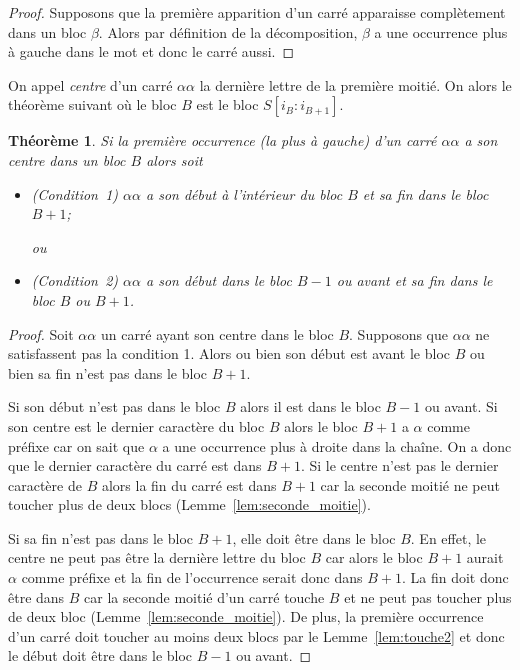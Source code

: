 \documentclass[10pt,letterpaper,oneside]{article}
\newtheorem{theorem}{Théorème}
\begin{document}
\begin{proof}
    Supposons que la première apparition d'un carré apparaisse complètement dans un bloc $\beta$. Alors par définition de la décomposition, $\beta$ a une occurrence plus à gauche dans le mot et donc le carré aussi.
\end{proof}

On appel \emph{centre} d'un carré $\alpha\alpha$ la dernière lettre de la première moitié. On alors le théorème suivant où le bloc $B$ est le bloc $S[i_B:i_{B+1}]$.

\begin{theorem} \label{thm:conditioncarre}
    Si la première occurrence (la plus à gauche) d'un carré $\alpha\alpha$ a son centre dans un bloc $B$ alors soit
    \begin{itemize}
        \item (Condition~1) $\alpha\alpha$ a son début  à l'intérieur du bloc $B$ et sa fin dans le bloc $B+1$;
        
        ou
        \item (Condition~2) $\alpha\alpha$ a son début dans le bloc $B-1$ ou avant et sa fin dans le bloc $B$ ou $B+1$.
    \end{itemize}
\end{theorem}
\begin{proof}
    Soit $\alpha\alpha$ un carré ayant son centre dans le bloc $B$. Supposons que $\alpha\alpha$ ne satisfassent pas la condition 1. Alors ou bien son début est avant le bloc $B$ ou bien sa fin n'est pas dans le bloc $B+1$.

    Si son début n'est pas dans le bloc $B$ alors il est dans le bloc $B-1$ ou avant. Si son centre est le dernier caractère du bloc $B$ alors le bloc $B+1$ a $\alpha$ comme préfixe car on sait que $\alpha$ a une occurrence plus à droite dans la chaîne. On a donc que le dernier caractère du carré est dans $B+1$. Si le centre n'est pas le dernier caractère de $B$ alors la fin du carré est dans $B+1$ car la seconde moitié ne peut toucher plus de deux blocs (Lemme~\ref{lem:seconde_moitie}).

    Si sa fin n'est pas dans le bloc $B+1$, elle doit être dans le bloc $B$.
    En effet, le centre ne peut pas être la dernière lettre du bloc $B$ car alors le bloc $B+1$ aurait $\alpha$ comme préfixe et la fin de l'occurrence serait donc dans $B+1$.
    La fin doit donc être dans $B$ car la seconde moitié d'un carré touche $B$ et ne peut pas toucher plus de deux bloc (Lemme~\ref{lem:seconde_moitie}). De plus, la première occurrence d'un carré doit toucher au moins deux blocs par le Lemme~\ref{lem:touche2} et donc le début doit être dans le bloc $B-1$ ou avant.
\end{proof}
\end{document}
